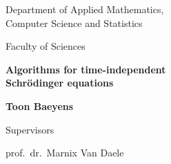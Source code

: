 \begin{titlepage}


    \begin{minipage}{6cm}
        \begin{flushleft}
            Department of Applied Mathematics, \\
            Computer Science and Statistics

            \vspace{3mm}

            {Faculty of Sciences}
        \end{flushleft}
    \end{minipage}

    \vspace{35mm}

    \begin{center}
        {\selectfont
            \textbf{ Algorithms for time-independent\\\vspace{3mm}Schrödinger equations}
        }

        \vspace{6mm}

        \textbf{ Toon Baeyens}

    \end{center}

    \vspace{1cm}

    \begin{center}
        {Supervisors} \\\vspace{1mm}
        \begin{minipage}{45mm}
            prof.\ dr.\ Marnix Van Daele


\end{minipage}
\end{center}
\end{titlepage}
